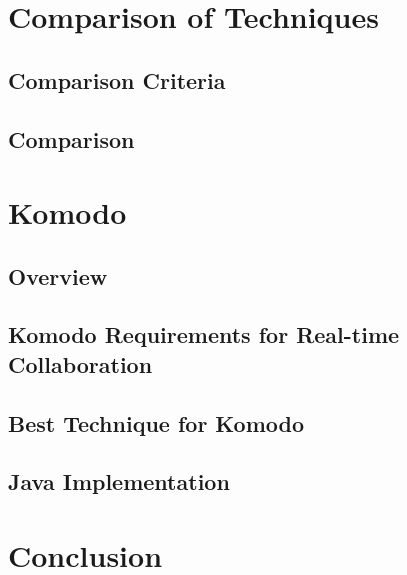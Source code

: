 \documentclass[12pt,oneside]{fithesis2}
\begin{document}
\chapter{Comparison of Techniques}
\section{Comparison Criteria}
\section{Comparison}
\chapter{Komodo}
\section{Overview}
\section{Komodo Requirements for Real-time Collaboration}
\section{Best Technique for Komodo}
\section{Java Implementation}
\chapter{Conclusion}
 
 
\end{document}
